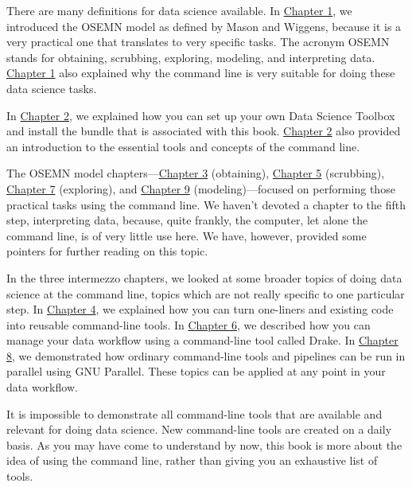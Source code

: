 \documentclass[
]{book}
\theoremstyle{definition}
\theoremstyle{definition}
\theoremstyle{definition}
\theoremstyle{remark}
\begin{document}
There are many definitions for data science available. In \protect\hyperlink{chapter-1-introduction}{Chapter 1}, we introduced the OSEMN model as defined by Mason and Wiggens, because it is a very practical one that translates to very specific tasks. The acronym OSEMN stands for obtaining, scrubbing, exploring, modeling, and interpreting data. \protect\hyperlink{chapter-1-introduction}{Chapter 1} also explained why the command line is very suitable for doing these data science tasks.

In \protect\hyperlink{chapter-2-getting-started}{Chapter 2}, we explained how you can set up your own Data Science Toolbox and install the bundle that is associated with this book. \protect\hyperlink{chapter-2-getting-started}{Chapter 2} also provided an introduction to the essential tools and concepts of the command line.

The OSEMN model chapters---\protect\hyperlink{chapter-3-obtaining-data}{Chapter 3} (obtaining), \protect\hyperlink{chapter-5-scrubbing-data}{Chapter 5} (scrubbing), \protect\hyperlink{chapter-7-exploring-data}{Chapter 7} (exploring), and \protect\hyperlink{chapter-9-modeling-data}{Chapter 9} (modeling)---focused on performing those practical tasks using the command line. We haven't devoted a chapter to the fifth step, interpreting data, because, quite frankly, the computer, let alone the command line, is of very little use here. We have, however, provided some pointers for further reading on this topic.

In the three intermezzo chapters, we looked at some broader topics of doing data science at the command line, topics which are not really specific to one particular step. In \protect\hyperlink{chapter-4-creating-reusable-command-line-tools}{Chapter 4}, we explained how you can turn one-liners and existing code into reusable command-line tools. In \protect\hyperlink{chapter-6-managing-your-data-workflow}{Chapter 6}, we described how you can manage your data workflow using a command-line tool called Drake. In \protect\hyperlink{chapter-8-parallel-pipelines}{Chapter 8}, we demonstrated how ordinary command-line tools and pipelines can be run in parallel using GNU Parallel. These topics can be applied at any point in your data workflow.

It is impossible to demonstrate all command-line tools that are available and relevant for doing data science. New command-line tools are created on a daily basis. As you may have come to understand by now, this book is more about the idea of using the command line, rather than giving you an exhaustive list of tools.
\end{document}
